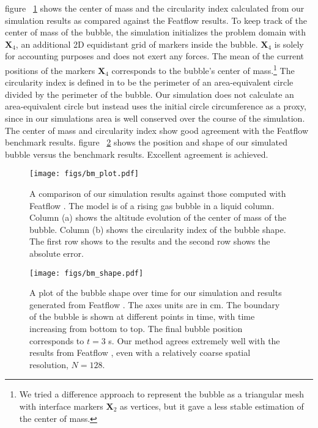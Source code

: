 \documentclass{jfm}
\begin{document}
figure ~\ref{fig:bm_plot} shows the center of mass and the circularity index calculated from our simulation results as compared against the Featflow results. To keep track of the center of mass of the bubble, the simulation initializes the problem domain with $\bm{X}_4$, an additional 2D equidistant grid of markers inside the bubble. $\bm{X}_4$ is solely for accounting purposes and does not exert any forces. The mean of the current positions of the markers $\bm{X}_4$ corresponds to the bubble's center of mass.\footnote{We tried a difference approach to represent the bubble as a triangular mesh with interface markers $\bm{X}_2$ as vertices, but it gave a less stable estimation of the center of mass.} The circularity index is defined in \citet{turek2021numerical} to be the perimeter of an area-equivalent circle divided by the perimeter of the bubble. Our simulation does not calculate an area-equivalent circle but instead uses the initial circle circumference as a proxy, since in our simulations area is well conserved over the course of the simulation. The center of mass and circularity index show good agreement with the Featflow benchmark results. figure ~\ref{fig:bm_shape} shows the position and shape of our simulated bubble versus the benchmark results. Excellent agreement is achieved.

\begin{figure}
\centering
\texttt{[image: figs/bm\_plot.pdf]}
\caption{A comparison of our simulation results against those computed with Featflow \citep{turek2021numerical}. The model is of a rising gas bubble in a liquid column. Column (a) shows the altitude evolution of the center of mass of the bubble. Column (b) shows the circularity index of the bubble shape. The first row shows to the results and the second row shows the absolute error.}
\label{fig:bm_plot}
\end{figure}
\begin{figure}
\centering
\texttt{[image: figs/bm\_shape.pdf]}
\caption{A plot of the bubble shape over time for our simulation and results generated from Featflow \citep{turek2021numerical}. The axes units are in cm. The boundary of the bubble is shown at different points in time, with time increasing from bottom to top. The final bubble position corresponds to $t = 3$ s. Our method agrees extremely well with the results from Featflow \citep{turek2021numerical}, even with a relatively coarse spatial resolution, $N=128$. }
\label{fig:bm_shape}
\end{figure}
\end{document}
